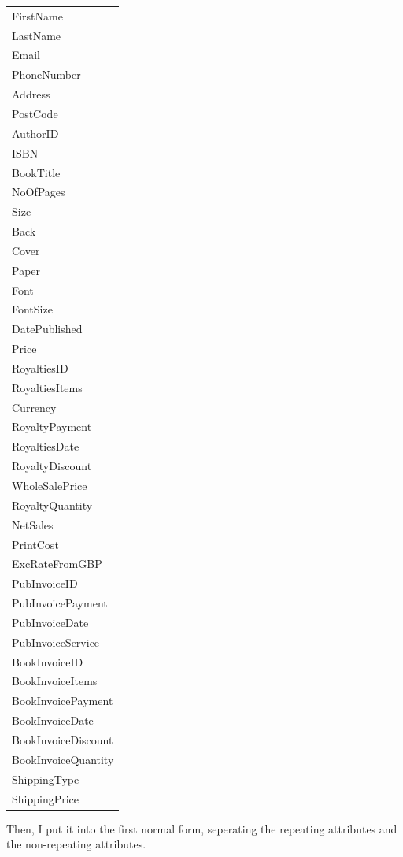 \begin{tabular}{|p{3.5cm}|}
    \hline
    FirstName \\
    LastName \\
    Email \\
    PhoneNumber \\
    Address \\
    PostCode \\
    AuthorID \\
    ISBN \\
    BookTitle \\
    NoOfPages \\
    Size \\
    Back \\
    Cover \\
    Paper \\
    Font \\
    FontSize \\
    DatePublished \\
    Price \\
    RoyaltiesID \\
    RoyaltiesItems \\
    Currency \\
    RoyaltyPayment \\
    RoyaltiesDate \\
    RoyaltyDiscount \\
    WholeSalePrice \\
    RoyaltyQuantity \\
    NetSales \\
    PrintCost \\
    ExcRateFromGBP \\
    PubInvoiceID \\
    PubInvoicePayment \\
    PubInvoiceDate \\
    PubInvoiceService \\
    BookInvoiceID \\
    BookInvoiceItems \\
    BookInvoicePayment \\
    BookInvoiceDate \\
    BookInvoiceDiscount \\
    BookInvoiceQuantity \\
    ShippingType \\
    ShippingPrice \\
    \hline
\end{tabular}

\newpage
Then, I put it into the first normal form, seperating the repeating attributes and the non-repeating attributes.

